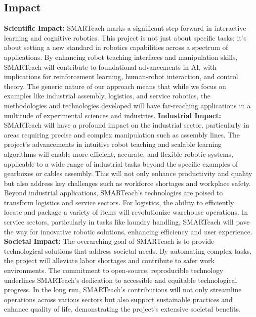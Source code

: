 \begin{refsection}
\subsection{Impact}
\textbf{Scientific Impact:} SMARTeach marks a significant step forward in interactive learning and cognitive robotics. This project is not just about specific tasks; it's about setting a new standard in robotics capabilities across a spectrum of applications. By enhancing robot teaching interfaces and manipulation skills, SMARTeach will contribute to foundational advancements in AI, with implications for reinforcement learning, human-robot interaction, and control theory. The generic nature of our approach means that while we focus on examples like industrial assembly, logistics, and service robotics, the methodologies and technologies developed will have far-reaching applications in a multitude of experimental sciences and industries. \newline
\textbf{Industrial Impact:} SMARTeach will have a profound impact on the industrial sector, particularly in areas requiring precise and complex manipulation such as assembly lines. The project's advancements in intuitive robot teaching and scalable learning algorithms will enable more efficient, accurate, and flexible robotic systems, applicable to a wide range of industrial tasks beyond the specific examples of gearboxes or cables assembly. This will not only enhance productivity and quality but also address key challenges such as workforce shortages and workplace safety.
Beyond industrial applications, SMARTeach's technologies are poised to transform logistics and service sectors. For logistics, the ability to efficiently locate and package a variety of items will revolutionize warehouse operations. In service sectors, particularly in tasks like laundry handling, SMARTeach will pave the way for innovative robotic solutions, enhancing efficiency and user experience. \newline
\textbf{Societal Impact:} The overarching goal of SMARTeach is to provide technological solutions that address societal needs. By automating complex tasks, the project will alleviate labor shortages and contribute to safer work environments. The commitment to open-source, reproducible technology underlines SMARTeach’s dedication to accessible and equitable technological progress. In the long run, SMARTeach's contributions will not only streamline operations across various sectors but also support sustainable practices and enhance quality of life, demonstrating the project’s extensive societal benefits.


\end{refsection}
